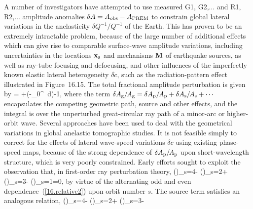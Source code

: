 A number of investigators have attempted to use
measured G1, G2,\hspace{0.2mm}$\ldots$ and R1, R2,\hspace{0.2mm}$\ldots$
amplitude anomalies $\delta A=A_{\rm obs}-A_{\rm PREM}$
to constrain global lateral variations in the anelasticity
$\delta Q^{-1}/Q^{-1}$ of the Earth.  This has proven
to be an extremely intractable problem, because of the
large number of additional effects which can give rise
to comparable surface-wave amplitude variations,
including uncertainties in the locations $\mbox{${\bf x}$}_{\rm s}$
and mechanisms $\mbox{${\bf M}$}$ of earthquake sources,
as well as ray-tube focusing and defocusing,
and other influences of the imperfectly known
elastic lateral heterogeneity $\delta c$,
such as the radiation-pattern effect
illustrated in Figure~16.15.
The total fractional amplitude perturbation
is given by
\eq \label{16.intrinsic}
=
+\;\exp\left(-\int_0^{\Delta}
\,d\Delta\right)-1,
\en
where the term $\delta A_{\rm g}/\hspace{-0.4 mm}A_{\rm g}
=\delta A_{\rm p}/\hspace{-0.4 mm}A_{\rm p}
+\delta A_{\rm s}/\hspace{-0.4 mm}A_{\rm s}
+\cdots$ encapsulates the competing geometric
path, source and other effects, and the integral
is over the unperturbed great-circular ray path
of a minor-arc or higher-orbit wave.
Several approaches have been used
to deal with the geometrical variations
in global anelastic tomographic studies.
It is not feasible simply to correct for
the effects of lateral wave-speed variations
$\delta c$ using existing phase-speed maps,
because of the strong dependence
of $\delta A_{\rm p}/\hspace{-0.4 mm}A_{\rm p}$
upon short-wavelength structure, which is very
poorly constrained.  Early efforts sought to
exploit the observation that, in first-order
ray perturbation theory,
\eq \label{16.4data1}
\left(\right)_{s=4}-
\left(\right)_{s=2}+
\left(\right)_{s=3}-
\left(\right)_{s=1}=0,
\en
by virtue of the alternating odd and even
dependence~(\ref{16.relative2}) upon orbit
number $s$.  The source term
satisfies an analogous relation,
\eq \label{16.4data1p}
\left(\right)_{s=4}-
\left(\right)_{s=2}+
\left(\right)_{s=3}-
